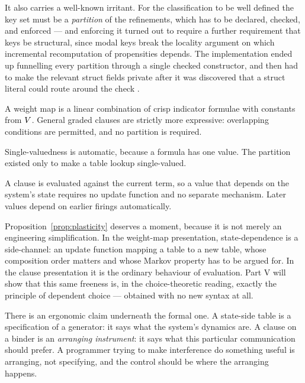 It also carries a well-known irritant. For the classification to be well defined
the key set must be a \emph{partition} of the refinements, which has to be
declared, checked, and enforced --- and enforcing it turned out to require a
further requirement that keys be structural, since modal keys break the locality
argument on which incremental recomputation of propensities depends. The
implementation ended up funnelling every partition through a single checked
constructor, and then had to make the relevant struct fields private after it was
discovered that a struct literal could route around the check \cite{WeightedGSLT}.

\begin{theorem}
\label{thm:dnf}
A weight map is a linear combination of crisp indicator formulae with constants
from $V$. General graded clauses are strictly more expressive: overlapping
conditions are permitted, and no partition is required.
\end{theorem}

\begin{corollary}
\label{cor:nopartition}
Single-valuedness is automatic, because a formula has one value. The partition
existed only to make a table lookup single-valued.
\end{corollary}

\begin{proposition}
\label{prop:plasticity}
A clause is evaluated against the current term, so a value that depends on the
system's state requires no update function and no separate mechanism. Later values
depend on earlier firings automatically.
\end{proposition}

Proposition~\ref{prop:plasticity} deserves a moment, because it is not merely an
engineering simplification. In the weight-map presentation, state-dependence is a
side-channel: an update function mapping a table to a new table, whose composition
order matters and whose Markov property has to be argued for. In the clause
presentation it is the ordinary behaviour of evaluation. Part V will show that
this same freeness is, in the choice-theoretic reading, exactly the principle of
dependent choice --- obtained with no new syntax at all.

\begin{remark}
There is an ergonomic claim underneath the formal one. A state-side table is a
specification of a generator: it says what the system's dynamics are. A clause on
a binder is an \emph{arranging instrument}: it says what this particular
communication should prefer. A programmer trying to make interference do something
useful is arranging, not specifying, and the control should be where the arranging
happens.
\end{remark}

